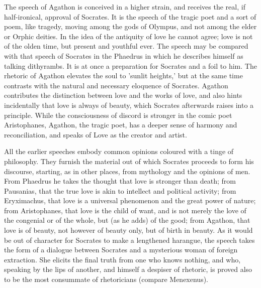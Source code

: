\documentclass[11pt,letter]{article}
\begin{document}
\par  The speech of Agathon is conceived in a higher strain, and receives the real, if half-ironical, approval of Socrates. It is the speech of the tragic poet and a sort of poem, like tragedy, moving among the gods of Olympus, and not among the elder or Orphic deities. In the idea of the antiquity of love he cannot agree; love is not of the olden time, but present and youthful ever. The speech may be compared with that speech of Socrates in the Phaedrus in which he describes himself as talking dithyrambs. It is at once a preparation for Socrates and a foil to him. The rhetoric of Agathon elevates the soul to 'sunlit heights,' but at the same time contrasts with the natural and necessary eloquence of Socrates. Agathon contributes the distinction between love and the works of love, and also hints incidentally that love is always of beauty, which Socrates afterwards raises into a principle. While the consciousness of discord is stronger in the comic poet Aristophanes, Agathon, the tragic poet, has a deeper sense of harmony and reconciliation, and speaks of Love as the creator and artist.

\par  All the earlier speeches embody common opinions coloured with a tinge of philosophy. They furnish the material out of which Socrates proceeds to form his discourse, starting, as in other places, from mythology and the opinions of men. From Phaedrus he takes the thought that love is stronger than death; from Pausanias, that the true love is akin to intellect and political activity; from Eryximachus, that love is a universal phenomenon and the great power of nature; from Aristophanes, that love is the child of want, and is not merely the love of the congenial or of the whole, but (as he adds) of the good; from Agathon, that love is of beauty, not however of beauty only, but of birth in beauty. As it would be out of character for Socrates to make a lengthened harangue, the speech takes the form of a dialogue between Socrates and a mysterious woman of foreign extraction. She elicits the final truth from one who knows nothing, and who, speaking by the lips of another, and himself a despiser of rhetoric, is proved also to be the most consummate of rhetoricians (compare Menexenus).
\end{document}

